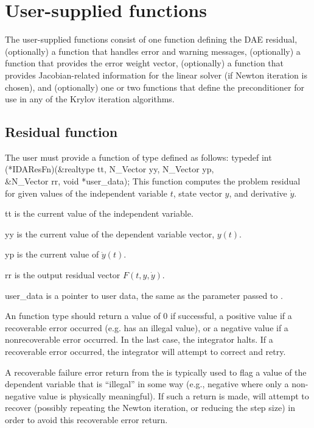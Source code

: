 {%
\section{User-supplied functions}\label{ss:user_fct_sim}

The user-supplied functions consist of one function defining the DAE residual,
(optionally) a function that handles error and warning messages, 
(optionally) a function that provides the error weight vector,
(optionally) a function that provides Jacobian-related information for the linear 
solver (if Newton iteration is chosen), and (optionally) one or two functions 
that define the preconditioner for use in any of the Krylov iteration algorithms.
\subsection{Residual function}\label{ss:resFn}
The user must provide a function of type  defined as follows:
{
  typedef int (*IDAResFn)(&realtype tt, N\_Vector yy, N\_Vector yp,  \\
                          &N\_Vector rr, void *user\_data);
}
{
  This function computes the problem residual for given values
  of the independent variable $t$, state vector $y$, and derivative $\dot{y}$.
}
{
  \begin{args}
  \item[tt]
    is the current value of the independent variable.
  \item[yy]
    is the current value of the dependent variable vector, $y(t)$.
  \item[yp]
    is the current value of $\dot{y}(t)$.
  \item[rr]
    is the output residual vector $F(t,y,\dot{y})$.
  \item[user\_data]
    is a pointer to user data, the same as the       
    parameter passed to .   
  \end{args}
}
{
  An  function type should return a value of $0$ if successful, 
  a positive value if a recoverable error occurred (e.g.  has an illegal
  value), or a negative value if a nonrecoverable error occurred. 
  In the last case, the integrator halts. 
  If a recoverable error occurred, the integrator will attempt to correct and retry.
}
{
  A recoverable failure error return from the  is typically used to
  flag a value of the dependent variable  that is ``illegal'' in
  some way (e.g., negative where only a non-negative value is physically
  meaningful).  If such a return is made, {\ida} will attempt to recover
  (possibly repeating the Newton iteration, or reducing the step size)
  in order to avoid this recoverable error return.

}}
